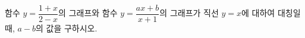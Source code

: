 \hspace*{2mm}\begin{minipage}[t]{\dimexpr\linewidth-2mm\relax}\vspace{0pt}
함수 $y=\dfrac{1+x}{2-x}$의 그래프와 함수 $y=\dfrac{ax+b}{x+1}$의 그래프가 직선 $y=x$에 대하여 대칭일 때, $a-b$의 값을 구하시오. \end{minipage}
